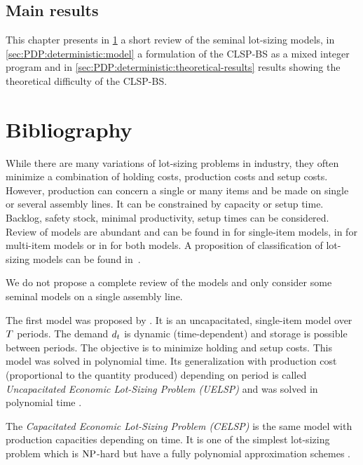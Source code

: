 \subsection{Main results}
\label{sec:PDP:deterministic:introduction:main-results}


This chapter presents in \cref{sec:PDP:deterministic:bibliography} a short review of the seminal lot-sizing models, in \cref{sec:PDP:deterministic:model} a formulation of the CLSP-BS as a mixed integer program and in \cref{sec:PDP:deterministic:theoretical-results} results showing the theoretical difficulty of the CLSP-BS.



\section{Bibliography}
\label{sec:PDP:deterministic:bibliography}

While there are many variations of lot-sizing problems in industry, they often minimize a combination of holding costs, production costs and setup costs.
However, production can concern a single or many items and be made on single or several assembly lines.
It can be constrained by capacity or setup time.
Backlog, safety stock, minimal productivity, setup times can be considered.
Review of models are abundant and can be found in \cite{Geunes2014} for single-item models, in \cite{Gicquel2008} for multi-item models or in \cite{Karimi2003} for both models.
A proposition of classification of lot-sizing models can be found in~\cite[Chapter 4 and 12]{Pochet2006}.

We do not propose a complete review of the models and only consider some seminal models on a single assembly line.

\medskip

The first model was proposed by \cite{Wagner1958}.
It is an uncapacitated, single-item model over $T$ periods.
The demand $d_t$ is dynamic (\ie time-dependent) and storage is possible between periods.
The objective is to minimize holding and setup costs.
This model was solved in polynomial time.
Its generalization with production cost (proportional to the quantity produced) depending on period is called \emph{Uncapacitated Economic Lot-Sizing Problem (UELSP)} and was solved in polynomial time \cite{Federgruen1991,Wagelmans1992,Aggarwal1993}.


The \emph{Capacitated Economic Lot-Sizing Problem (CELSP)} is the same model with production capacities depending on time.
It is one of the simplest lot-sizing problem which is $\operatorname{NP}$-hard \cite{Florian1980} but have a fully polynomial approximation schemes \cite{vanHoesel2001}.

